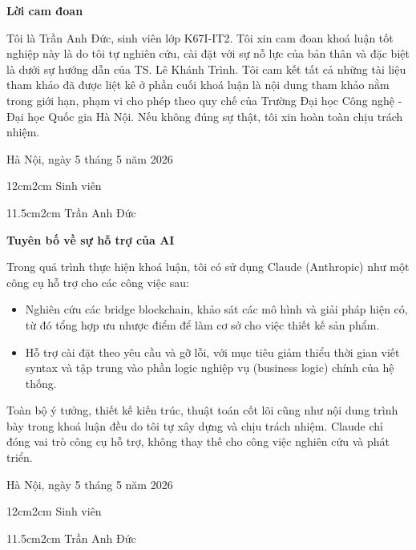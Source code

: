 \setcounter{page}{1}
\begin{center}
\textbf{\large{Lời cam đoan}	}
\end{center}
Tôi là Trần Anh Đức, sinh viên lớp K67I-IT2. Tôi xin cam đoan khoá luận tốt nghiệp này là do tôi tự nghiên cứu, cài đặt với sự nỗ lực của bản thân và đặc biệt là dưới sự hướng dẫn của TS. Lê Khánh Trình. Tôi cam kết tất cả những tài liệu tham khảo đã được liệt kê ở phần cuối khoá luận là nội dung tham khảo nằm trong giới hạn, phạm vi cho phép theo quy chế của Trường Đại học Công nghệ - Đại học Quốc gia Hà Nội. Nếu không đúng sự thật, tôi xin hoàn toàn chịu trách nhiệm.

\begin{flushright}
Hà Nội, ngày 5 tháng 5 năm 2026
\end{flushright}

\begin{changemargin}{12cm}{2cm}
Sinh viên
\\[2cm]
\end{changemargin}

\begin{changemargin}{11.5cm}{2cm}
Trần Anh Đức
\end{changemargin}

\newpage\cleardoublepage

\begin{center}
\textbf{\large{Tuyên bố về sự hỗ trợ của AI}}
\end{center}

Trong quá trình thực hiện khoá luận, tôi có sử dụng Claude (Anthropic) như một công cụ hỗ trợ cho các công việc sau:

\begin{itemize}
    \item Nghiên cứu các bridge blockchain, khảo sát các mô hình và giải pháp hiện có, từ đó tổng hợp ưu nhược điểm để làm cơ sở cho việc thiết kế sản phẩm.
    \item Hỗ trợ cài đặt theo yêu cầu và gỡ lỗi, với mục tiêu giảm thiểu thời gian viết syntax và tập trung vào phần logic nghiệp vụ (business logic) chính của hệ thống.
\end{itemize}

Toàn bộ ý tưởng, thiết kế kiến trúc, thuật toán cốt lõi cũng như nội dung trình bày trong khoá luận đều do tôi tự xây dựng và chịu trách nhiệm. Claude chỉ đóng vai trò công cụ hỗ trợ, không thay thế cho công việc nghiên cứu và phát triển.

\begin{flushright}
Hà Nội, ngày 5 tháng 5 năm 2026
\end{flushright}

\begin{changemargin}{12cm}{2cm}
Sinh viên
\\[2cm]
\end{changemargin}

\begin{changemargin}{11.5cm}{2cm}
Trần Anh Đức
\end{changemargin}